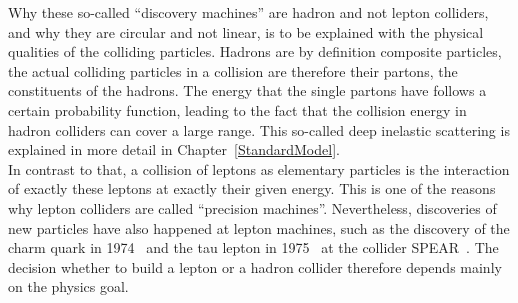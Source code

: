 Why these so-called ``discovery machines'' are hadron and not lepton colliders, and why they are circular and not linear, is to be explained with the physical qualities of the colliding particles.
Hadrons are by definition composite particles, the actual colliding particles in a collision are therefore their partons, the constituents of the hadrons.
The energy that the single partons have follows a certain probability function, leading to the fact that the collision energy in hadron colliders can cover a large range.
This so-called deep inelastic scattering is explained in more detail in Chapter~\ref{StandardModel}.\\
In contrast to that, a collision of leptons as elementary particles is the interaction of exactly these leptons at exactly their given energy.
This is one of the reasons why lepton colliders are called ``precision machines''.
Nevertheless, discoveries of new particles have also happened at lepton machines, such as the discovery of the charm quark in 1974~\cite{charm} and the tau lepton in 1975~\cite{tau} at the \positron\electron collider SPEAR~\cite{SPEAR}.
The decision whether to build a lepton or a hadron collider therefore depends mainly on the physics goal.

